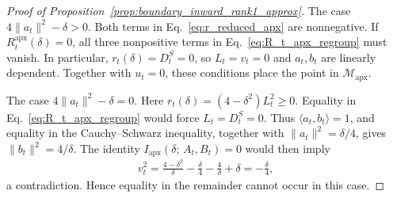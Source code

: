 \documentclass[10pt,a4paper]{amsart}
\newcommand{\apx}{\mathrm{apx}}
\newcommand{\iapx}{I_{\mathrm{apx}}}
\providecommand{\paragraph}{}
\begin{document}
\begin{proof}[Proof of Proposition~\ref{prop:boundary_inward_rank1_approx}]
\paragraph{The case $4\|a_t\|^2-\delta>0$.}
Both terms in Eq.~\eqref{eq:r_reduced_apx} are nonnegative. If
$R_t^\apx(\delta)=0$, all three nonpositive terms in
Eq.~\eqref{eq:R_t_apx_regroup} must vanish. In particular,
$r_t(\delta)=D_t^S=0$, so $L_t=v_t=0$ and $a_t,b_t$ are linearly dependent.
Together with $u_t=0$, these conditions place the point in $\mathcal M_\apx$.

\paragraph{The case $4\|a_t\|^2-\delta=0$.}
Here $r_t(\delta)=(4-\delta^2)L_t^2\ge0$. Equality in
Eq.~\eqref{eq:R_t_apx_regroup} would force $L_t=D_t^S=0$. Thus
$\langle a_t,b_t\rangle=1$, and equality in the Cauchy--Schwarz inequality,
together with $\|a_t\|^2=\delta/4$, gives $\|b_t\|^2=4/\delta$.
The identity $\iapx(\delta;\,A_t,B_t)=0$ would then imply
\begin{align}
    v_t^2
    =\frac{4-\delta^2}{\delta}
     -\frac{\delta}{4}-\frac{4}{\delta}+\delta
    =-\frac{\delta}{4},
\end{align}
a contradiction. Hence equality in the remainder cannot occur in this case.


\end{proof}
\end{document}
